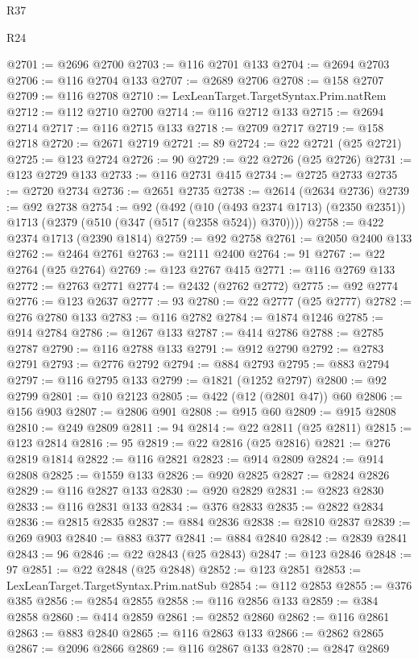 \begin{lexlean}{R37}
\begin{lexlean}{R24}
\begin{coremodule}
{{{{{{{{{{{{{{{{{{{{{{{{{{{{{{{{{{{{{{{{{{{{{{{{{{{{{{{{{{{{{{{{{{{{{{{{{{{{{{{{{{{{{{{{{{{{{{{{{{{{{{{{{{{{{{{{{{{{{{{{{{{{{{{{{{{{{{{{{{{{{{{{{{{{{{{{{{{{{{{{{{{{{{{{{{{{{{{{{{{{{{{{{@2701 := @2696 @2700
@2703 := @116 @2701 @133
@2704 := @2694 @2703
@2706 := @116 @2704 @133
@2707 := @2689 @2706
@2708 := @158 @2707
@2709 := @116 @2708
@2710 := LexLeanTarget.TargetSyntax.Prim.natRem
@2712 := @112 @2710 @2700
@2714 := @116 @2712 @133
@2715 := @2694 @2714
@2717 := @116 @2715 @133
@2718 := @2709 @2717
@2719 := @158 @2718
@2720 := @2671 @2719
@2721 := 89
@2724 := @22 @2721 (@25 @2721)
@2725 := @123 @2724
@2726 := 90
@2729 := @22 @2726 (@25 @2726)
@2731 := @123 @2729 @133
@2733 := @116 @2731 @415
@2734 := @2725 @2733
@2735 := @2720 @2734
@2736 := @2651 @2735
@2738 := @2614 (@2634 @2736)
@2739 := @92 @2738
@2754 := @92
    (@492
      (@10 (@493 @2374 @1713) (@2350 @2351))
      @1713
      (@2379 (@510 (@347 (@517 (@2358 @524)) @370))))
@2758 := @422 @2374 @1713 (@2390 @1814)
@2759 := @92 @2758
@2761 := @2050 @2400 @133
@2762 := @2464 @2761
@2763 := @2111 @2400
@2764 := 91
@2767 := @22 @2764 (@25 @2764)
@2769 := @123 @2767 @415
@2771 := @116 @2769 @133
@2772 := @2763 @2771
@2774 := @2432 (@2762 @2772)
@2775 := @92 @2774
@2776 := @123 @2637
@2777 := 93
@2780 := @22 @2777 (@25 @2777)
@2782 := @276 @2780 @133
@2783 := @116 @2782
@2784 := @1874 @1246
@2785 := @914 @2784
@2786 := @1267 @133
@2787 := @414 @2786
@2788 := @2785 @2787
@2790 := @116 @2788 @133
@2791 := @912 @2790
@2792 := @2783 @2791
@2793 := @2776 @2792
@2794 := @884 @2793
@2795 := @883 @2794
@2797 := @116 @2795 @133
@2799 := @1821 (@1252 @2797)
@2800 := @92 @2799
@2801 := @10 @2123
@2805 := @422 (@12 (@2801 @47)) @60
@2806 := @156 @903
@2807 := @2806 @901
@2808 := @915 @60
@2809 := @915 @2808
@2810 := @249 @2809
@2811 := 94
@2814 := @22 @2811 (@25 @2811)
@2815 := @123 @2814
@2816 := 95
@2819 := @22 @2816 (@25 @2816)
@2821 := @276 @2819 @1814
@2822 := @116 @2821
@2823 := @914 @2809
@2824 := @914 @2808
@2825 := @1559 @133
@2826 := @920 @2825
@2827 := @2824 @2826
@2829 := @116 @2827 @133
@2830 := @920 @2829
@2831 := @2823 @2830
@2833 := @116 @2831 @133
@2834 := @376 @2833
@2835 := @2822 @2834
@2836 := @2815 @2835
@2837 := @884 @2836
@2838 := @2810 @2837
@2839 := @269 @903
@2840 := @883 @377
@2841 := @884 @2840
@2842 := @2839 @2841
@2843 := 96
@2846 := @22 @2843 (@25 @2843)
@2847 := @123 @2846
@2848 := 97
@2851 := @22 @2848 (@25 @2848)
@2852 := @123 @2851
@2853 := LexLeanTarget.TargetSyntax.Prim.natSub
@2854 := @112 @2853
@2855 := @376 @385
@2856 := @2854 @2855
@2858 := @116 @2856 @133
@2859 := @384 @2858
@2860 := @414 @2859
@2861 := @2852 @2860
@2862 := @116 @2861
@2863 := @883 @2840
@2865 := @116 @2863 @133
@2866 := @2862 @2865
@2867 := @2096 @2866
@2869 := @116 @2867 @133
@2870 := @2847 @2869
}}}}}}}}}}}}}}}}}}}}}}}}}}}}}}}}}}}}}}}}}}}}}}}}}}}}}}}}}}}}}}}}}}}}}}}}}}}}}}}}}}}}}}}}}}}}}}}}}}}}}}}}}}}}}}}}}}}}}}}}}}}}}}}}}}}}}}}}}}}}}}}}}}}}}}}}}}}}}}}}}}}}}}}}}}}}}}}}}}}}}}}}}
\end{coremodule}
\end{lexlean}
\end{lexlean}
